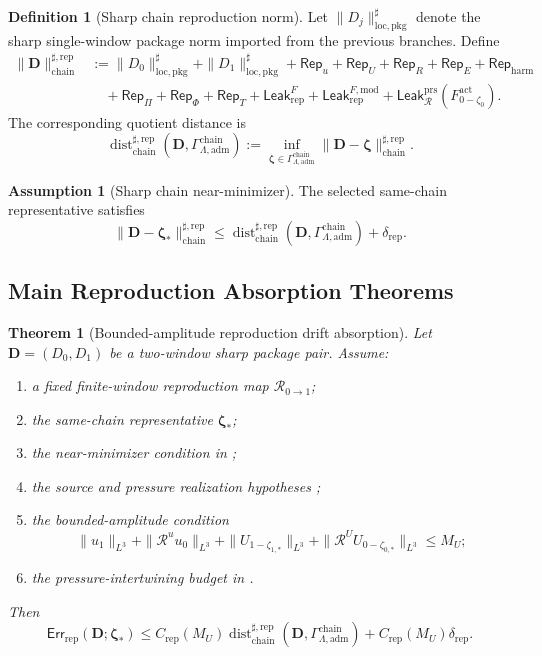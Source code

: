 \documentclass[11pt]{article}
\numberwithin{equation}{section}
\newtheorem{theorem}{Theorem}[section]
\theoremstyle{definition}
\newtheorem{definition}[definition]{Definition}
\newtheorem{assumption}[assumption]{Assumption}
\theoremstyle{remark}
\newcommand{\loc}{\mathrm{loc}}
\newcommand{\pkg}{\mathrm{pkg}}
\newcommand{\adm}{\mathrm{adm}}
\newcommand{\prs}{\mathrm{prs}}
\newcommand{\harm}{\mathrm{harm}}
\newcommand{\rep}{\mathrm{rep}}
\newcommand{\chain}{\mathrm{chain}}
\newcommand{\Err}{\mathsf{Err}}
\newcommand{\Leak}{\mathsf{Leak}}
\newcommand{\Rep}{\mathsf{Rep}}
\newcommand{\Dist}{\operatorname{dist}}
\newcommand{\calR}{\mathcal R}
\newcommand{\bD}{\mathbf D}
\newcommand{\bzeta}{\boldsymbol\zeta}
\newcommand{\Gchain}{\Gamma_{\Lambda,\adm}^{\chain}}
\begin{document}
\begin{definition}[Sharp chain reproduction norm]
\label{rep:def:sharp-chain-reproduction-norm}
Let \(\|D_j\|_{\loc,\pkg}^{\sharp}\) denote the sharp single-window package
norm imported from the previous branches.  Define
\[
\begin{aligned}
    \|\bD\|_{\chain}^{\sharp,\rep}
    &:=
    \|D_0\|_{\loc,\pkg}^{\sharp}
    +
    \|D_1\|_{\loc,\pkg}^{\sharp}
    +
    \Rep_u+\Rep_U+\Rep_R+\Rep_E+\Rep_{\harm}
\\
    &\quad+
    \Rep_{\Pi}+\Rep_{\Phi}+\Rep_T
    +
    \Leak_{\rep}^{F}
    +
    \Leak_{\rep}^{F,\mathrm{mod}}
    +
    \Leak_{\calR}^{\prs}(F^{\mathrm{act}}_{0-\zeta_0}).
\end{aligned}
\]
The corresponding quotient distance is
\[
    \Dist_{\chain}^{\sharp,\rep}(\bD,\Gchain)
    :=
    \inf_{\bzeta\in\Gchain}
    \|\bD-\bzeta\|_{\chain}^{\sharp,\rep}.
\]
\end{definition}

\begin{assumption}[Sharp chain near-minimizer]
\label{rep:ass:chain-near-minimizer}
The selected same-chain representative satisfies
\[
    \|\bD-\bzeta_*\|_{\chain}^{\sharp,\rep}
    \le
    \Dist_{\chain}^{\sharp,\rep}(\bD,\Gchain)
    +
    \delta_{\rep}.
\]
\end{assumption}

\subsection{Main Reproduction Absorption Theorems}
\label{rep:sec:main-theorems}

\begin{theorem}[Bounded-amplitude reproduction drift absorption]
\label{rep:thm:bounded-amplitude-reproduction-absorption}
Let \(\bD=(D_0,D_1)\) be a two-window sharp package pair.  Assume:
\begin{enumerate}[label=\textup{(\roman*)},leftmargin=*]
    \item a fixed finite-window reproduction map \(\calR_{0\to1}\);
    \item the same-chain representative \(\bzeta_*\);
    \item the near-minimizer condition in ;
    \item the source and pressure realization hypotheses
    ;
    \item the bounded-amplitude condition
    \[
        \|u_1\|_{L^3}
        +
        \|\calR^u u_0\|_{L^3}
        +
        \|U_{1-\zeta_{1,*}}\|_{L^3}
        +
        \|\calR^U U_{0-\zeta_{0,*}}\|_{L^3}
        \le
        M_U;
    \]
    \item the pressure-intertwining budget in
    .
\end{enumerate}
Then
\[
    \Err_{\rep}(\bD;\bzeta_*)
    \le
    C_{\rep}(M_U)
    \Dist_{\chain}^{\sharp,\rep}(\bD,\Gchain)
    +
    C_{\rep}(M_U)\delta_{\rep}.
\]
\end{theorem}
\end{document}
